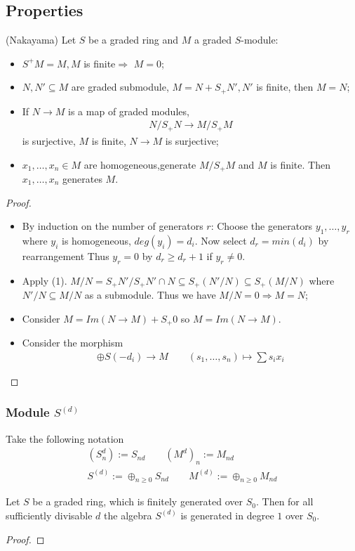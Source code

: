 \documentclass[Total.tex]{subfiles}
\begin{document}
			\subsection{Properties}
			\begin{lemma}
				 (Nakayama) Let $S$ be a graded ring and $M$ a graded $S$-module:
				\begin{itemize}
					\item $S^+M=M,M$ is finite$\Rightarrow$ $M=0$;
					\item $N,N'\subseteq M$ are graded submodule, $M=N+S_+ N',N'$ is finite, then $M=N$;
					\item If $N\rightarrow M$ is a map of graded modules,
					\begin{gather*}
						N/S_+N\rightarrow M/S_+ M
					\end{gather*}
					is surjective, $M$ is finite, $N\rightarrow M$ is surjective;
					\item $x_1,\dots,x_n\in M$ are homogeneous,generate $M/S_+M$ and $M$ is finite. Then $x_1,\dots,x_n$ generates $M$.
				\end{itemize}
			\end{lemma}
			\begin{proof}
				\begin{itemize}
					\item By induction on the number of generators $r$: Choose the generators $y_1,\dots,y_r$ where $y_i$ is homogeneous, $deg(y_i)=d_i$. Now select $d_r=min(d_i)$ by rearrangement Thus $y_r=0$ by $d_r\geq d_r+1$ if $y_r\not=0$.
					\item Apply (1). $M/N=S_+N'/S_+N'\cap N\subseteq S_+(N'/N)\subseteq S_+(M/N)$ where $N'/N\subseteq M/N$ as a submodule. Thus we have $M/N=0\Rightarrow M=N$;
					\item Consider $M=Im(N\rightarrow M)+S_+0$ so $M=Im(N\rightarrow M)$.
					\item Consider the morphism
					\begin{gather*}
						\oplus S(-d_i)\rightarrow M\qquad (s_1,\dots,s_n)\mapsto \sum s_i x_i
					\end{gather*}
				\end{itemize}
			\end{proof}
			
			\subsubsection{Module $S^{(d)}$}
			\begin{Def}
				Take the following notation
				\begin{gather*}
					(S^d_n):=S_{nd}\qquad (M^{d})_n:=M_{nd}\\
					S^{(d)}:=\oplus_{n\geq 0} S_{nd}\qquad M^{(d)}:=\oplus_{n\geq 0} M_{nd}
				\end{gather*}
			\end{Def}
			\begin{lemma}
				Let $S$ be a graded ring, which is finitely generated over $S_0$. Then for all sufficiently divisable $d$ the algebra $S^{(d)}$ is generated in degree $1$ over $S_0$.
			\end{lemma}
			\begin{proof}
				
			\end{proof}
\end{document}
